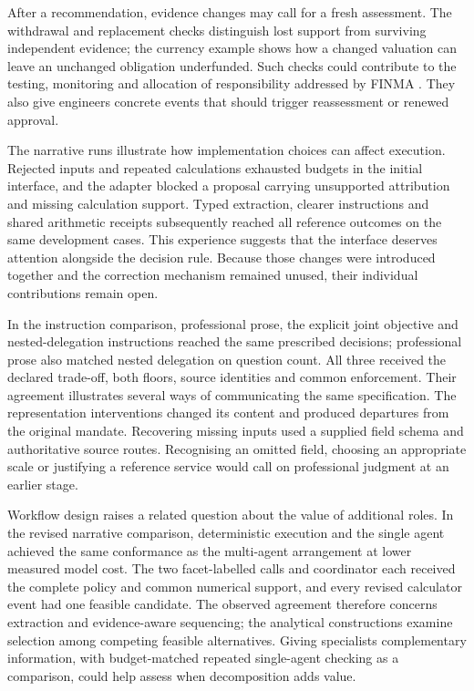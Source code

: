 \documentclass[oneside,10pt,english]{swissi}
\begin{document}
After a recommendation, evidence changes may call for a fresh assessment. The withdrawal and replacement checks distinguish lost support from surviving independent evidence; the currency example shows how a changed valuation can leave an unchanged obligation underfunded. Such checks could contribute to the testing, monitoring and allocation of responsibility addressed by FINMA \parencite[secs.~2.1 and 2.4]{finma2024ai}. They also give engineers concrete events that should trigger reassessment or renewed approval.

The narrative runs illustrate how implementation choices can affect execution. Rejected inputs and repeated calculations exhausted budgets in the initial interface, and the adapter blocked a proposal carrying unsupported attribution and missing calculation support. Typed extraction, clearer instructions and shared arithmetic receipts subsequently reached all reference outcomes on the same development cases. This experience suggests that the interface deserves attention alongside the decision rule. Because those changes were introduced together and the correction mechanism remained unused, their individual contributions remain open.

In the instruction comparison, professional prose, the explicit joint objective and nested-delegation instructions reached the same prescribed decisions; professional prose also matched nested delegation on question count. All three received the declared trade-off, both floors, source identities and common enforcement. Their agreement illustrates several ways of communicating the same specification. The representation interventions changed its content and produced departures from the original mandate. Recovering missing inputs used a supplied field schema and authoritative source routes. Recognising an omitted field, choosing an appropriate scale or justifying a reference service would call on professional judgment at an earlier stage.

Workflow design raises a related question about the value of additional roles. In the revised narrative comparison, deterministic execution and the single agent achieved the same conformance as the multi-agent arrangement at lower measured model cost. The two facet-labelled calls and coordinator each received the complete policy and common numerical support, and every revised calculator event had one feasible candidate. The observed agreement therefore concerns extraction and evidence-aware sequencing; the analytical constructions examine selection among competing feasible alternatives. Giving specialists complementary information, with budget-matched repeated single-agent checking as a comparison, could help assess when decomposition adds value.
\end{document}
